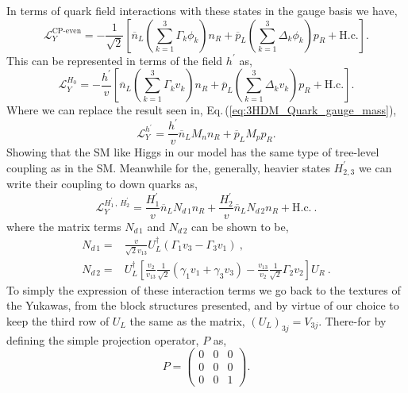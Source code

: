 In terms of quark field interactions with these states in the gauge basis we have, 
%
\begin{equation}
\mathcal{L}_Y^{\text{CP-even}} = 
- \frac{1}{\sqrt{2}} \left[ \overline{n}_L \left( \sum_{k=1}^3 \Gamma_k \phi_k \right) n_R + \overline{p}_L \left( \sum_{k=1}^3 \Delta_k \phi_k \right) p_R  + \text{H.c.}  \right] . 
\end{equation}
This can be represented in terms of the field $h^\prime$ as, 
\begin{equation}
\mathcal{L}_Y^{H_0} =
- \frac{h^\prime}{v} \left[ \overline{n}_L \left( \sum_{k=1}^3 \Gamma_k v_k \right) n_R + \overline{p}_L \left( \sum_{k=1}^3 \Delta_k v_k \right) p_R + \text{H.c.} \right] .
\end{equation}
%
Where we can replace the result seen in, Eq.\,(\ref{eq:3HDM_Quark_gauge_mass}), 
%
\begin{equation}
\mathcal{L}_Y^{h^\prime} = \frac{h^\prime}{v} \overline{n}_L M_n n_R +  \overline{p}_L M_p p_R .  
\end{equation} 
Showing that the SM like Higgs in our model has the same type of tree-level coupling as in the SM. 
%
Meanwhile for the, generally, heavier states $H_{2,3}^\prime$ we can write their coupling to down quarks as, 
\begin{equation}
\mathcal{L}^{H_1^\prime \, , \, H_2^\prime}_Y = 
\frac{H_1^\prime}{v} \overline{n}_L N_{d\,1} n_R + 
\frac{H_2^\prime}{v} \overline{n}_L N_{d\,2} n_R + 
\text{H.c.} \ . 
\end{equation} 
% 
where the matrix terms $N_{d\,1}$ and $N_{d\,2}$ can be shown to be, 
\begin{equation}
\begin{split}
N_{d\,1} = & \frac{v}{\sqrt{2} v_{13}} U_L^\dagger \left( \Gamma_1 v_3 - \Gamma_3 v_1 \right) \ , \\ 
N_{d\,2} = & U_L^\dagger \left[ \frac{v_2}{v_{13}} \frac{1}{\sqrt{2}} \left( \gamma_1 v_1 + \gamma_3 v_3 \right) - \frac{v_{13}}{v_2} \frac{1}{\sqrt{2}} \Gamma_2 v_2  \right] U_R \ . 
\end{split} 
\end{equation}
To simply the expression of these interaction terms we go back to the textures of the Yukawas, from the block structures presented, and by virtue of our choice to keep the third row of $U_L$ the same as the  matrix, $(U_L)_{3j} = V_{3j}$. There-for by defining the simple projection operator, $P$ as, 
\begin{equation}
P = 
\begin{pmatrix}
0 & 0 & 0 \\ 
0 & 0 & 0 \\ 
0 & 0 & 1 
\end{pmatrix}. 
\end{equation}
